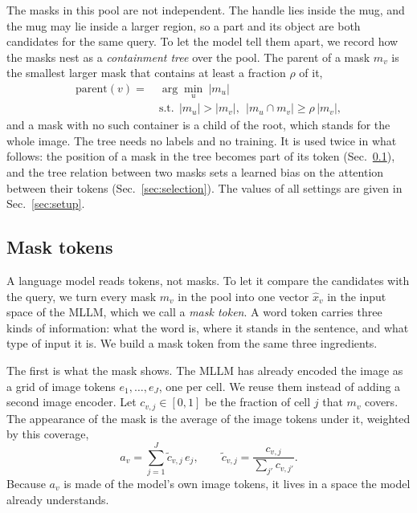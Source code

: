 The masks in this pool are not independent. The handle lies inside the mug, and the mug may lie inside a larger
region, so a part and its object are both candidates for the same query. To let the model tell them apart, we
record how the masks nest as a \emph{containment tree} over the pool. The parent of a mask $m_v$ is the smallest
larger mask that contains at least a fraction $\rho$ of it,
\begin{equation}
\begin{aligned}
  \mathrm{parent}(v)=\ &\arg\min_{u}\ |m_u| \\
  &\text{s.t.}\ \ |m_u|>|m_v|,\ \ |m_u\cap m_v|\ge\rho\,|m_v| ,
\end{aligned}
  \label{eq:tree}
\end{equation}
and a mask with no such container is a child of the root, which stands for the whole image. The tree needs no
labels and no training. It is used twice in what follows: the position of a mask in the tree becomes part of its
token (Sec.~\ref{sec:tokens}), and the tree relation between two masks sets a learned bias on the attention between
their tokens (Sec.~\ref{sec:selection}). The values of all settings are given in Sec.~\ref{sec:setup}.

\subsection{Mask tokens}
\label{sec:tokens}

A language model reads tokens, not masks. To let it compare the candidates with the query, we turn every mask $m_v$
in the pool into one vector $\hat{x}_v$ in the input space of the MLLM, which we call a \emph{mask token}. A word
token carries three kinds of information: what the word is, where it stands in the sentence, and what type of input
it is. We build a mask token from the same three ingredients.

The first is what the mask shows. The MLLM has already encoded the image as a grid of image tokens
$e_1,\dots,e_J$, one per cell. We reuse them instead of adding a second image encoder. Let $c_{v,j}\in[0,1]$ be the
fraction of cell $j$ that $m_v$ covers. The appearance of the mask is the average of the image tokens under it,
weighted by this coverage,
\begin{equation}
  a_v=\sum_{j=1}^{J}\tilde{c}_{v,j}\,e_j, \qquad \tilde{c}_{v,j}=\frac{c_{v,j}}{\sum_{j'}c_{v,j'}} .
  \label{eq:appearance}
\end{equation}
Because $a_v$ is made of the model's own image tokens, it lives in a space the model already understands.

